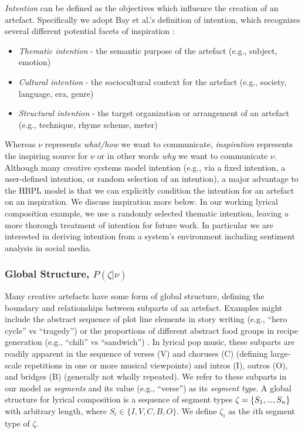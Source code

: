 \documentclass[letterpaper]{article}
\newcommand\mydots{\hbox to .75em{.\hss.\hss.}}
\begin{document}
\emph{Intention} can be defined as the objectives which influence the creation of an artefact. Specifically we adopt Bay et al.'s definition of intention, which recognizes several different potential facets of inspiration :

\begin{itemize}  
\item \emph{Thematic intention} - the semantic purpose of the artefact (e.g., subject, emotion)
\item \emph{Cultural intention} - the sociocultural context for the artefact (e.g., society, language, era, genre)
\item \emph{Structural intention} - the target organization or arrangement of an artefact (e.g., technique, rhyme scheme, meter)
\end{itemize}

Whereas $\nu$ represents \emph{what/how} we want to communicate, \emph{inspiration} represents the inspiring source for $\nu$ or in other words \emph{why} we want to communicate $\nu$. Although many creative systems model intention (e.g., via a fixed intention, a user-defined intention, or random selection of an intention), a major advantage to the HBPL model is that we can explicitly condition the intention for an artefact on an inspiration. We discuss inspiration more below. In our working lyrical composition example, we use a randomly selected thematic intention, leaving a more thorough treatment of intention for future work. In particular we are interested in deriving intention from a system's environment including sentiment analysis in social media.

\subsubsection{Global Structure, $P(\zeta|\nu)$}

Many creative artefacts have some form of global structure, defining the boundary and relationships between subparts of an artefact. Examples might include the abstract sequence of plot line elements in story writing (e.g., ``hero cycle'' vs ``tragedy'') or the proportions of different abstract food groups in recipe generation (e.g., ``chili'' vs ``sandwich'') \cite{morris2012soup}. In lyrical pop music, these subparts are readily apparent in the sequence of verses (V) and choruses (C) (defining large-scale repetitions in one or more musical viewpoints) and intros (I), outros (O), and bridges (B) (generally not wholly repeated). We refer to these subparts in our model as \textit{segments} and its value (e.g., ``verse'') as its \textit{segment type}. A global structure for lyrical composition is a sequence of segment types $\zeta = \{S_1,\mydots,S_n\}$ with arbitrary length, where $S_i\in\{I,V,C,B,O\}$. We define $\zeta_i$ as the $i$th segment type of $\zeta$.
\end{document}
